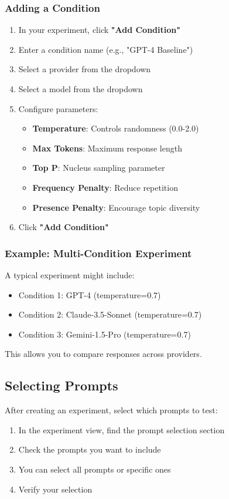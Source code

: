 \documentclass[11pt,a4paper]{article}
\begin{document}
\subsubsection{Adding a Condition}
\begin{enumerate}
    \item In your experiment, click \textbf{"Add Condition"}
    \item Enter a condition name (e.g., "GPT-4 Baseline")
    \item Select a provider from the dropdown
    \item Select a model from the dropdown
    \item Configure parameters:
    \begin{itemize}
        \item \textbf{Temperature}: Controls randomness (0.0-2.0)
        \item \textbf{Max Tokens}: Maximum response length
        \item \textbf{Top P}: Nucleus sampling parameter
        \item \textbf{Frequency Penalty}: Reduce repetition
        \item \textbf{Presence Penalty}: Encourage topic diversity
    \end{itemize}
    \item Click \textbf{"Add Condition"}
\end{enumerate}

\subsubsection{Example: Multi-Condition Experiment}
A typical experiment might include:
\begin{itemize}
    \item Condition 1: GPT-4 (temperature=0.7)
    \item Condition 2: Claude-3.5-Sonnet (temperature=0.7)
    \item Condition 3: Gemini-1.5-Pro (temperature=0.7)
\end{itemize}

This allows you to compare responses across providers.

\subsection{Selecting Prompts}
After creating an experiment, select which prompts to test:
\begin{enumerate}
    \item In the experiment view, find the prompt selection section
    \item Check the prompts you want to include
    \item You can select all prompts or specific ones
    \item Verify your selection
\end{enumerate}
\end{document}
